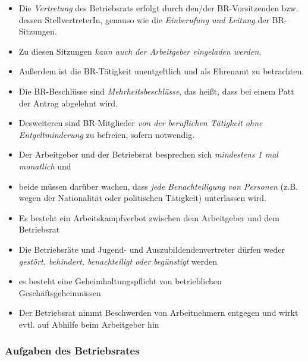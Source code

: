 \documentclass[a4paper, 12pt]{report}
\begin{document}
\begin{itemize}
    \item Die \emph{Vertretung} des Betriebsrats erfolgt durch den/der 
        BR-Vorsitzenden bzw. dessen StellvertreterIn, genauso wie die 
        \emph{Einberufung und Leitung} der BR-Sitzungen. 
    \item Zu diesen Sitzungen \emph{kann auch der Arbeitgeber eingeladen 
        werden}. 
    \item Außerdem ist die BR-Tätigkeit unentgeltlich und als Ehrenamt zu 
        betrachten. 
    \item Die BR-Beschlüsse sind \emph{Mehrheitsbeschlüsse}, das heißt, 
        dass bei einem Patt der Antrag abgelehnt wird. 
    \item Desweiteren sind BR-Mitglieder \emph{von der beruflichen Tätigkeit 
        ohne Entgeltminderung} zu befreien, sofern notwendig. 
    \item Der Arbeitgeber und der Betriebsrat besprechen sich \emph{mindestens 
        1 mal monatlich} und 
    \item beide müssen darüber wachen, dass \emph{jede Benachteiligung von 
        Personen} (z.B. wegen der Nationalität oder politischen Tätigkeit) 
        unterlassen wird. 
    \item Es besteht ein Arbeitskampfverbot zwischen dem Arbeitgeber und dem 
        Betriebsrat
    \item Die Betriebsräte und Jugend- und Auszubildendenvertreter dürfen weder 
        \emph{gestört, behindert, benachteiligt oder begünstigt} werden
    \item es besteht eine Geheimhaltungspflicht von betrieblichen 
        Geschäftsgeheimnissen
    \item Der Betriebsrat nimmt Beschwerden von Arbeitnehmern entgegen und wirkt
        evtl. auf Abhilfe beim Arbeitgeber hin
\end{itemize}

\subsubsection{Aufgaben des Betriebsrates}
\end{document}
